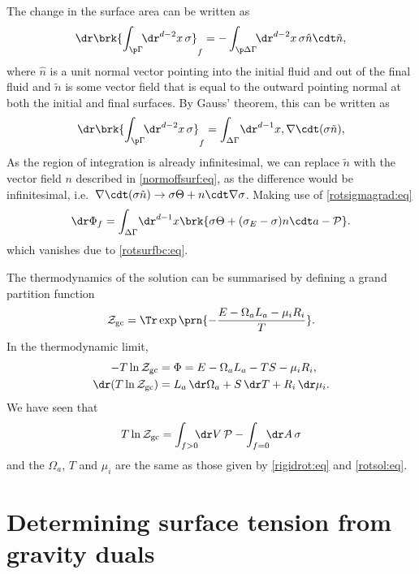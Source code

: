 \documentclass[12pt]{article}
\newcommand{\ploc}{\mathcal{P}}
\newcommand{\mg}{\mu}
\newcommand{\gpf}{\mathcal{Z}_\mathrm{gc}}
\newcommand{\aint}{\int_{\p\Gamma}\!\!\dr^{d-2}x}
\newcommand{\dvint}{\int_{\Delta\Gamma}\!\dr^{d-1}x}
\newcommand{\daint}{\int_{\p\Delta\Gamma}\!\!\dr^{d-2}x}
\begin{document}
The change in the surface area can be written as
%
\begin{equation*}
  \dr\brk{\aint\,\sigma}_f = -\daint\,\sigma \hat{n}\cdt\tilde{n},
\end{equation*}
%
where $\hat{n}$ is a unit normal vector pointing into the initial fluid and out of the final fluid and $\tilde{n}$ is some vector field that is equal to the outward pointing normal at both the initial and final surfaces. By Gauss' theorem, this can be written as
%
\begin{equation*}
  \dr\brk{\aint\,\sigma}_f= \dvint, \nabla\cdt(\sigma\tilde{n}),
\end{equation*}
%
As the region of integration is already infinitesimal, we can replace $\tilde{n}$ with the vector field $n$ described in \eqref{normoffsurf:eq}, as the difference would be infinitesimal, i.e.\ $\nabla\cdt(\sigma\tilde{n}) \to \sigma\Theta + n\cdt\nabla\sigma$.
Making use of \eqref{rotsigmagrad:eq}
%
\begin{equation*}
  \dr\Phi_f = \dvint\brk{\sigma\Theta + (\sigma_E-\sigma)n\cdt a - \ploc}.
\end{equation*}
%
which vanishes due to \eqref{rotsurfbc:eq}.

The thermodynamics of the solution can be summarised by defining a grand partition function
%
\begin{equation}\label{gpf:eq}
  \gpf = \Tr\exp\prn{-\frac{E -\Omega_a L_a  - \mg_i R_i}{T}}.
\end{equation}
%
In the thermodynamic limit,
%
\begin{equation}\label{gpftherm:eq}
  \begin{split}
    -T\ln\gpf &= \Phi = E -\Omega_a L_a - T S - \mg_i R_i, \\
    \dr(T\ln\gpf) &= L_a \,\dr \Omega_a + S \,\dr T + R_i \,\dr \mg_i.
  \end{split}
\end{equation}
%
We have seen that
%
\begin{equation}\label{gpfrot:eq}
  T\ln\gpf = \int_{f>0}\!\!\!\dr V \,\ploc - \int_{f=0}\!\!\!\dr A \,\sigma
\end{equation}
%
and the $\Omega_a$, $T$ and $\mg_i$ are the same as those given by \eqref{rigidrot:eq} and \eqref{rotsol:eq}.



\section{Determining surface tension from gravity duals}\label{sec:fromgravity}
\end{document}
